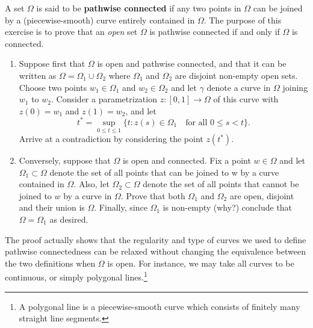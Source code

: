 \begin{exercise}
A set $\Omega$ is said to be \textbf{pathwise connected} if any two points in $\Omega$ can be joined by a (piecewise-smooth) curve entirely contained in $\Omega$. The purpose of this exercise is to prove that an \textit{open} set $\Omega$ is pathwise connected if and only if $\Omega$ is connected.

\begin{enumerate}[label=(\alph*)]
\item Suppose first that $\Omega$ is open and pathwise connected, and that it can be written as $\Omega = \Omega_1 \cup \Omega_2$ where $\Omega_1$ and $\Omega_2$ are disjoint non-empty open sets. Choose two points $w_1 \in \Omega_1$ and $w_2 \in \Omega_2$ and let $\gamma$ denote a curve in $\Omega$ joining $w_1$ to $w_2$. Consider a parametrization $z: [0, 1] \to \Omega$ of this curve with $z(0) = w_1$ and $z(1) = w_2$, and let
$$t^* = \sup_{0\leq t\leq1} \{t : z(s) \in \Omega_1 \quad \text{for all } 0 \leq s<t\}.$$
Arrive at a contradiction by considering the point $z(t^*)$.
\item Conversely, suppose that $\Omega$ is open and connected. Fix a point $w \in \Omega$ and let $\Omega_1 \subset \Omega$ denote the set of all points that can be joined to w by a curve contained in $\Omega$. Also, let $\Omega_2 \subset \Omega$ denote the set of all points that cannot be joined to $w$ by a curve in $\Omega$. Prove that both $\Omega_1$ and $\Omega_2$ are open, disjoint and their union is $\Omega$. Finally, since $\Omega_1$ is non-empty (why?) conclude that $\Omega=\Omega_1$ as desired.
\end{enumerate}
The proof actually shows that the regularity and type of curves we used to define pathwise connectedness can be relaxed without changing the equivalence between the two definitions when $\Omega$ is open. For instance, we may take all curves to be continuous, or simply polygonal lines.\footnote{A polygonal line is a piecewise-smooth curve which consists of finitely many straight line segments.
}
\end{exercise}

